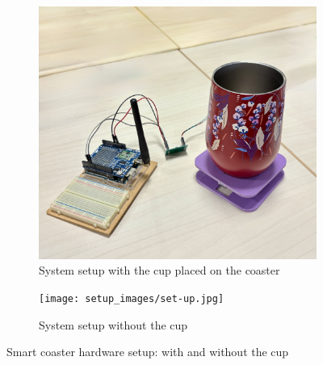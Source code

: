 \begin{figure}[H]
    \centering
    \begin{subfigure}[b]{0.45\linewidth}
        \centering
        \includegraphics[width=\linewidth]{setup_images/set-up-with-cup.jpg}
        \caption{System setup with the cup placed on the coaster}
        \label{fig:setup-with-cup}
    \end{subfigure}
    \hfill
    \begin{subfigure}[b]{0.45\linewidth}
        \centering
        \texttt{[image: setup\_images/set-up.jpg]}
        \caption{System setup without the cup}
        \label{fig:setup-without-cup}
    \end{subfigure}
    \caption{Smart coaster hardware setup: with and without the cup}
    \label{fig:system-setup-views}
\end{figure}
